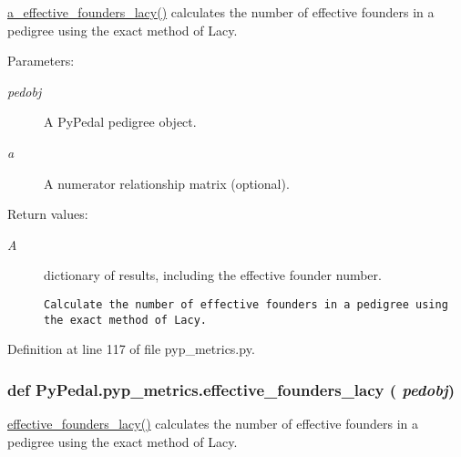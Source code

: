 \hyperlink{namespacePyPedal_1_1pyp__metrics_3e7338b4892ff4cdedeb907a08114414}{a\_\-effective\_\-founders\_\-lacy()} calculates the number of effective founders in a pedigree using the exact method of Lacy. 

\begin{Desc}
\item[Parameters:]
\begin{description}
\item[{\em pedobj}]A Py\-Pedal pedigree object. \item[{\em a}]A numerator relationship matrix (optional). \end{description}
\end{Desc}
\begin{Desc}
\item[Return values:]
\begin{description}
\item[{\em A}]dictionary of results, including the effective founder number.

\footnotesize\begin{verbatim}Calculate the number of effective founders in a pedigree using the exact method of Lacy.
\end{verbatim}
\normalsize
 \end{description}
\end{Desc}


Definition at line 117 of file pyp\_\-metrics.py.\hypertarget{namespacePyPedal_1_1pyp__metrics_7fd43aa5db477016b9a1cceb7f2eb52d}{
\subsubsection[effective\_\-founders\_\-lacy]{\setlength{\rightskip}{0pt plus 5cm}def Py\-Pedal.pyp\_\-metrics.effective\_\-founders\_\-lacy ( {\em pedobj})}}
\label{namespacePyPedal_1_1pyp__metrics_7fd43aa5db477016b9a1cceb7f2eb52d}


\hyperlink{namespacePyPedal_1_1pyp__metrics_7fd43aa5db477016b9a1cceb7f2eb52d}{effective\_\-founders\_\-lacy()} calculates the number of effective founders in a pedigree using the exact method of Lacy. 

